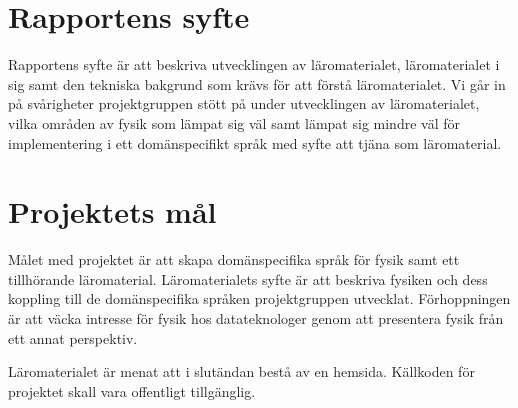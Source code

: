 %

\section{Rapportens syfte}

\begin{draft}
Rapportens syfte är att beskriva utvecklingen av läromaterialet, läromaterialet
i sig samt den tekniska bakgrund som krävs för att förstå läromaterialet. Vi går in på
svårigheter projektgruppen stött på under utvecklingen av läromaterialet, vilka områden
av fysik som lämpat sig väl samt lämpat sig mindre väl för implementering i ett 
domänspecifikt språk med syfte att tjäna som läromaterial.

\end{draft}


\section{Projektets mål}

\begin{draft}

\iffalse
Projekets mål är att skapa ett roligt läromaterial som kombinerar fysik med
tillhörande domänspecika språk. Läromaterialets syfte är att väcka intresse hos läsaren
för fysikaliska samband samt inspirera till vidare studier. DSL:erna är menade att modellera specifikt utvalda
områden inom fysik. Den tillhörande brödtexten är menad att beskriva både DSL:erna, fysiken i sig,    %
samt kopplingen mellan dem.
\fi
Målet med projektet är att skapa domänspecifika språk för fysik samt ett   
tillhörande läromaterial. Läromaterialets syfte är att beskriva fysiken och
dess koppling till de domänspecifika språken projektgruppen utvecklat. Förhoppningen är att väcka intresse
för fysik hos datateknologer genom att presentera fysik från ett annat
perspektiv.

Läromaterialet är menat att i slutändan bestå av en hemsida. Källkoden för projektet
skall vara offentligt tillgänglig.

\end{draft}

